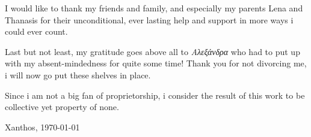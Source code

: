 I would like to thank my friends and family, and especially my parents
Lena and Thanasis for their unconditional, ever lasting help and support in more
ways i could ever count.

Last but not least, my gratitude goes above all to \textgreek{\emph{Αλεξάνδρα}}
who had to put up with my absent-mindedness for quite some time! Thank you for not 
divorcing me, i will now go put these shelves in place.

Since i am not a big fan of proprietorship, i consider the result of this work to 
be collective yet property of none.
\par
\begin{flushright}
  Xanthos, \today\par
\end{flushright}
\vfill
